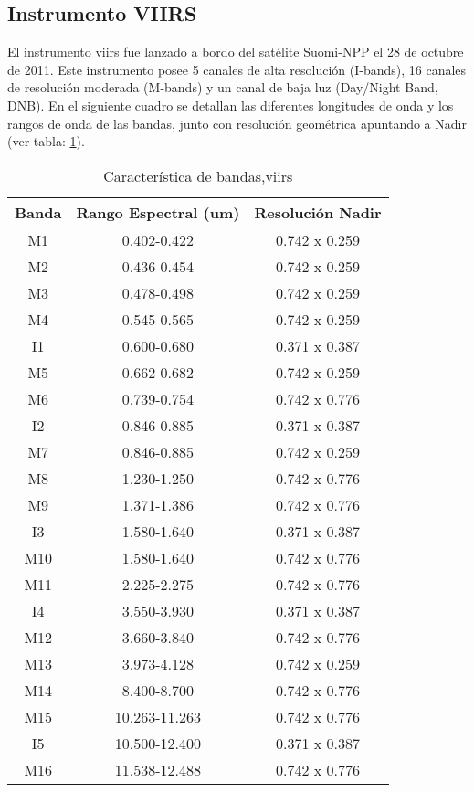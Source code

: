 \subsection{Instrumento VIIRS}\label{sub:viirs}
El instrumento \ac{viirs} fue lanzado a bordo del satélite Suomi-NPP el 28 de octubre de 2011. Este instrumento posee 5 canales de alta resolución (I-bands), 16 canales de resolución moderada (M-bands) y un canal de baja luz (Day/Night Band, DNB).  En el siguiente cuadro se detallan las diferentes longitudes de onda y los rangos de onda de las bandas, junto con resolución geométrica apuntando a Nadir (ver tabla: \ref{tab:viirs}).
\begin{table}[H]
\begin{center}
\begin{tabular}{|c|c|c|}
\hline Banda & Rango Espectral (um) & Resolución Nadir \\\hline 
 		M1  & 0.402-0.422   & 0.742 x 0.259 \\ \hline 
		M2  & 0.436-0.454   & 0.742 x 0.259 \\ \hline 
		M3  & 0.478-0.498   & 0.742 x 0.259 \\ \hline 
		M4  & 0.545-0.565   & 0.742 x 0.259 \\ \hline 
		I1  & 0.600-0.680   & 0.371 x 0.387 \\ \hline 
		M5  & 0.662-0.682   & 0.742 x 0.259 \\ \hline 
		M6  & 0.739-0.754   & 0.742 x 0.776 \\ \hline 
		I2  & 0.846-0.885   & 0.371 x 0.387 \\ \hline 
		M7  & 0.846-0.885   & 0.742 x 0.259 \\ \hline 
		M8  & 1.230-1.250   & 0.742 x 0.776 \\ \hline 
		M9  & 1.371-1.386   & 0.742 x 0.776 \\ \hline 
		I3  & 1.580-1.640   & 0.371 x 0.387 \\ \hline 
		M10 & 1.580-1.640   & 0.742 x 0.776 \\ \hline 
		M11 & 2.225-2.275   & 0.742 x 0.776 \\ \hline 
		I4  & 3.550-3.930   & 0.371 x 0.387 \\ \hline 
		M12 & 3.660-3.840   & 0.742 x 0.776 \\ \hline 
		M13 & 3.973-4.128   & 0.742 x 0.259 \\ \hline 
		M14 & 8.400-8.700   & 0.742 x 0.776 \\ \hline 
		M15 & 10.263-11.263 & 0.742 x 0.776 \\ \hline 
		I5  & 10.500-12.400 & 0.371 x 0.387 \\ \hline 
		M16 & 11.538-12.488 & 0.742 x 0.776 \\ \hline 
\end{tabular}
\end{center}\caption{Característica de bandas,\ac{viirs} \label{tab:viirs}}
\end{table}

